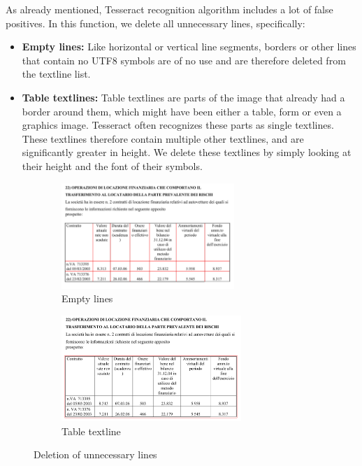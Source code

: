 \begin{description}
As already mentioned, Tesseract recognition algorithm includes a lot of false positives. In this function, we delete all unnecessary lines, specifically:

\begin{itemize}
\item\textbf {Empty lines: } Like horizontal or vertical line segments, borders or other lines that contain no UTF8 symbols are of no use and are therefore deleted from the textline list.

\item\textbf {Table textlines: } Table textlines are parts of the image that already had a border around them, which might have been either a table, form or even a graphics image. Tesseract often recognizes these parts as single textlines. These textlines therefore contain multiple other textlines, and are significantly greater in height. We delete these textlines by simply looking at their height and the font of their symbols.
\end{itemize}

\begin{figure}[H]
\begin{subfigure}{0.45\textwidth}
\includegraphics[width=\linewidth,height=40mm]{img/implementation/textlineEmpty.png}
\caption{Empty lines} \label{fig:1b}
\end{subfigure}
\hspace*{\fill} %
\begin{subfigure}{0.45\textwidth}
\includegraphics[width=\linewidth,height=40mm]{img/implementation/textlineTable.png}
\caption{Table textline} \label{fig:1c}
\end{subfigure}
\caption{Deletion of unnecessary lines} \label{fig:1}
\end{figure}


\end{description}
